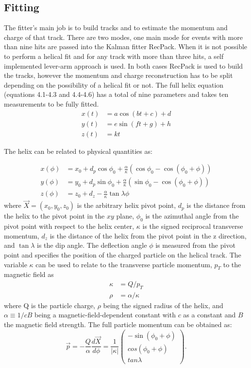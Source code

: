 \subsection{Fitting}
The fitter's main job is to build tracks and to estimate the momentum and charge of that track. There are two modes, one main mode for events with more than nine hits are passed into the Kalman fitter RecPack. When it is not possible to perform a helical fit and for any track with more than three hits, a self implemented lever-arm approach is used. In both cases RecPack is used to build the tracks, however the momentum and charge reconstruction has to be split depending on the possibility of a helical fit or not. The full helix equation (equations 4.1-4.3 and 4.4-4.6) has a total of nine parameters and takes ten measurements to be fully fitted.  
\begin{align}
x(t) &= a\cos(bt+c)+d\\
y(t) &= e\sin(ft+g) + h\\
z(t) &= kt
\end{align}

The helix can be related to physical quantities as:

\begin{align}
x(\phi) &= x_0 + d_p \cos \phi_0 + \frac{\alpha}{\kappa}(\cos \phi_0 - \cos(\phi_0 + \phi))\\ 
y(\phi) &= y_0 + d_p \sin \phi_0 + \frac{\alpha}{\kappa}(\sin \phi_0 - \cos(\phi_0 + \phi))\\
z(\phi) &= z_0 + d_z - \frac{\alpha}{\kappa} \tan \lambda \phi
\end{align}
where $\vec{X} = (x_0, y_0, z_0)$ is the arbitrary helix pivot point, $d_p$ is the distance from the helix to the pivot point in the $xy$ plane, $\phi_0$ is the azimuthal angle from the pivot point with respect to the helix center, $\kappa$ is the signed reciprocal transverse momentum, $d_z$ is the distance of the helix from the pivot point in the z direction, and $\tan\lambda$ is the dip angle. The deflection angle $\phi$ is measured from the pivot point and specifies the position of the charged particle on the helical track. The variable $\kappa$ can be used to relate to the transverse particle momentum, $p_T$ to the magnetic field as 
\begin{align}
 \kappa &=  Q/p_T \\  
 \rho &=  \alpha/\kappa
 \end{align}
where Q is the particle charge, $\rho$ being the signed radius of the helix, and $\alpha \equiv 1/c B$ being a magnetic-field-dependent constant with $c$ as a constant and $B$ the magnetic field strength. The full particle momentum can be obtained as: 
\begin{equation}
\vec{p} = - \frac{Q}{\alpha} \frac{d\vec{X}}{d\phi} = \frac{1}{|\kappa |} 
 \begin{pmatrix}
 -\sin(\phi_0 + \phi)\\
 cos(\phi_0 + \phi)\\
 tan\lambda
 \end{pmatrix}.
\end{equation}

